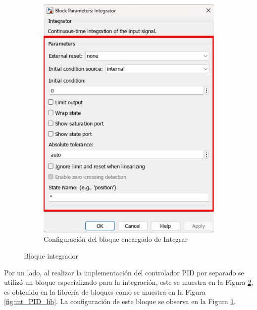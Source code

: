 \begin{figure}[htbp]
\begin{subfigure}[b]{0.45\textwidth}
        \includegraphics[width=\textwidth]{fig/Capitulo5/Caso_de_estudio_PID/config_integrator.pdf}
        \caption{Configuración del bloque encargado de Integrar}
        \label{fig:int_conf_PID}
    \end{subfigure}
    \caption{Bloque integrador}
    \label{fig:int_block}
\end{figure}

Por un lado, al realizar la implementación del controlador PID por separado se utilizó un bloque especializado para la integración, este se muestra en la Figura \ref{fig:int_block}, es obtenido en la librería de bloques como se muestra en la Figura \ref{fig:int_PID_lib}. La configuración de este bloque se observa en la Figura \ref{fig:int_conf_PID}.

\newpage

